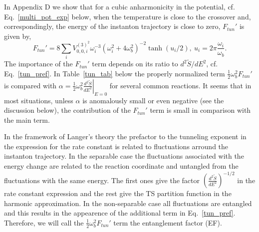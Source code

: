 \documentclass[journal=jpcafh,manuscript=article]{achemso}
\begin{document}
In Appendix D we show that for a cubic anharmonicity in the potential,
cf. Eq.~\ref{multi_pot_exp} below, when the temperature is close to
the crossover and, correspondingly, the energy of the instanton
trajectory is close to zero, $F_{tun}'$ is given by,
\begin{equation}
  \label{add_tun_cub}
  F_{tun}'=8\sum_iV^{(3)^2}_{0,0,i}\omega_i^{-3}(\omega_i^2+4\omega_b^2)^{-2}\tanh(u_i/2),\
  u_i=2\pi\frac{\omega_i}{\omega_b}.
\end{equation}
The importance of the $F_{tun}'$ term depends on its ratio to
$d^2\tilde{S}/dE^2$, cf. Eq.~\ref{tun_pref}.  In Table~\ref{tun_tab}
below the properly normalized term $\frac{1}{2}\omega_b^2F_{tun}'$ is
compared with
$\alpha=\frac{1}{2}\omega_b^2\left.\frac{d^2\tilde{S}}{dE^2}\right|_{E=0}$
for several common reactions.  It seems that in most situations,
unless $\alpha$ is anomalously small or even negative (see the
discussion below), the contribution of the $F_{tun}'$ term is small in
comparison with the main term.
    
In the framework of Langer's theory the prefactor to the tunneling
exponent in the expression for the rate constant is related to
fluctuations arround the instanton trajectory. In the separable case
the fluctuations associated with the energy change are related to the
reaction coordinate and untangled from the fluctuations with the same
energy. The first ones give the factor
$(\frac{d^2\tilde{S}}{dE^2})^{-1/2}$ in the rate constant expression
and the rest give the TS partition function in the harmonic
approximation. In the non-separable case all fluctuations are
entangled and this results in the appearence of the additional term in
Eq.~\ref{tun_pref}. Therefore, we will call the
$\frac{1}{2}\omega_b^2F_{tun}'$ term the entanglement factor (EF).
\end{document}
